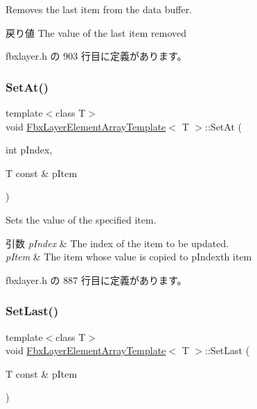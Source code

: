 Removes the last item from the data buffer. \begin{DoxyReturn}{戻り値}
The value of the last item removed 
\end{DoxyReturn}


 fbxlayer.\+h の 903 行目に定義があります。

\mbox{\label{class_fbx_layer_element_array_template_a70cf4f9a1b142eff8adae13ad1a79e6d}} 
\subsubsection{\texorpdfstring{Set\+At()}{SetAt()}}
{\footnotesize\ttfamily template$<$class T$>$ \\
void \hyperlink{class_fbx_layer_element_array_template}{Fbx\+Layer\+Element\+Array\+Template}$<$ T $>$\+::Set\+At (\begin{DoxyParamCaption}\item[{int}]{p\+Index,  }\item[{T const \&}]{p\+Item }\end{DoxyParamCaption})\hspace{0.3cm}{\ttfamily [inline]}}

Sets the value of the specified item. 
\begin{DoxyParams}{引数}
{\em p\+Index} & The index of the item to be updated. \\
\hline
{\em p\+Item} & The item whose value is copied to p\+Index\textquotesingle{}th item \\
\hline
\end{DoxyParams}


 fbxlayer.\+h の 887 行目に定義があります。

\mbox{\label{class_fbx_layer_element_array_template_a90c76493799f15b6345c83dc242f7b7c}} 
\subsubsection{\texorpdfstring{Set\+Last()}{SetLast()}}
{\footnotesize\ttfamily template$<$class T$>$ \\
void \hyperlink{class_fbx_layer_element_array_template}{Fbx\+Layer\+Element\+Array\+Template}$<$ T $>$\+::Set\+Last (\begin{DoxyParamCaption}\item[{T const \&}]{p\+Item }\end{DoxyParamCaption})\hspace{0.3cm}{\ttfamily [inline]}}

